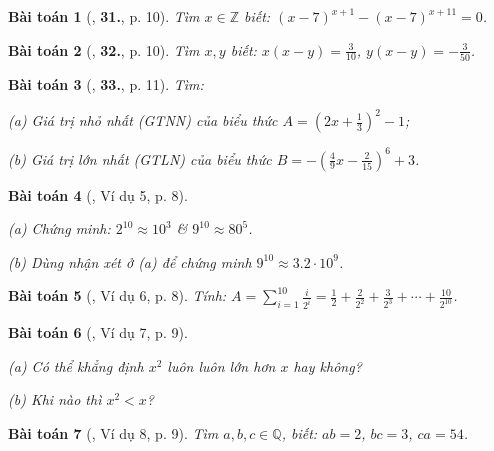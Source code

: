 \documentclass{article}
\numberwithin{equation}{section}
\newtheorem{baitoan}{Bài toán}[section]
\begin{document}
\begin{baitoan}[\cite{Tuyen_Toan_7}, \textbf{31.}, p. 10]
	Tìm $x\in\mathbb{Z}$ biết: $(x - 7)^{x + 1} - (x - 7)^{x + 11} = 0$.
\end{baitoan}

\begin{baitoan}[\cite{Tuyen_Toan_7}, \textbf{32.}, p. 10]
	Tìm $x,y$ biết: $x(x - y) = \frac{3}{10}$, $y(x - y) = -\frac{3}{50}$.
\end{baitoan}

\begin{baitoan}[\cite{Tuyen_Toan_7}, \textbf{33.}, p. 11]
	Tìm:
	\begin{enumerate*}
		\item[(a)] Giá trị nhỏ nhất (GTNN) của biểu thức $A = \left(2x + \frac{1}{3}\right)^2 - 1$;
		\item[(b)] Giá trị lớn nhất (GTLN) của biểu thức $B = -\left(\frac{4}{9}x - \frac{2}{15}\right)^6 + 3$.
	\end{enumerate*}
\end{baitoan}

\begin{baitoan}[\cite{Binh_Toan_7_tap_1}, Ví dụ 5, p. 8]
	\begin{enumerate*}
		\item[(a)] Chứng minh: $2^{10}\approx 10^3$ \& $9^{10}\approx 80^5$.
		\item[(b)] Dùng nhận xét ở (a) để chứng minh $9^{10}\approx 3.2\cdot 10^9$.
	\end{enumerate*}
\end{baitoan}

\begin{baitoan}[\cite{Binh_Toan_7_tap_1}, Ví dụ 6, p. 8]
	Tính: $A = \sum_{i=1}^{10} \frac{i}{2^i} = \frac{1}{2} + \frac{2}{2^2} + \frac{3}{2^3} + \cdots + \frac{10}{2^{10}}$.
\end{baitoan}

\begin{baitoan}[\cite{Binh_Toan_7_tap_1}, Ví dụ 7, p. 9]
	\begin{enumerate*}
		\item[(a)] Có thể khẳng định $x^2$ luôn luôn lớn hơn $x$ hay không?
		\item[(b)] Khi nào thì $x^2 < x$?
	\end{enumerate*}
\end{baitoan}

\begin{baitoan}[\cite{Binh_Toan_7_tap_1}, Ví dụ 8, p. 9]
	Tìm $a,b,c\in\mathbb{Q}$, biết: $ab = 2$, $bc = 3$, $ca = 54$.
\end{baitoan}
\end{document}
